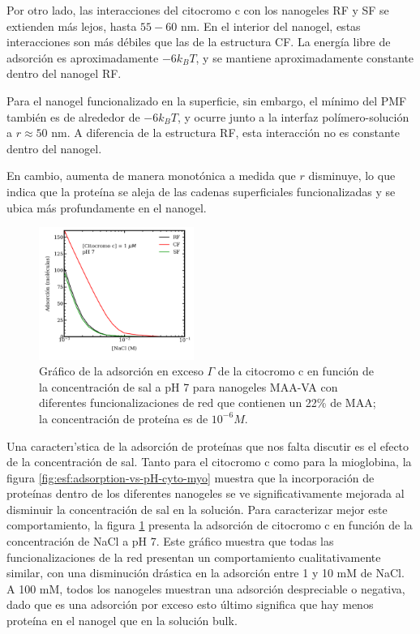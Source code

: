 Por otro lado, las interacciones del citocromo c con los nanogeles RF y SF se extienden m\'as lejos, hasta $55-60$ nm. En el interior del nanogel, estas interacciones son m\'as débiles que las de la estructura CF. La energ\'ia libre de adsorci\'on es aproximadamente $-6 k_BT$, y se mantiene aproximadamente constante dentro del nanogel RF.

Para el nanogel funcionalizado en la superficie, sin embargo, el m\'inimo del PMF tambi\'en es de alrededor de $-6 k_BT$, y ocurre junto a la interfaz pol\'imero-soluci\'on a $r\approx 50$ nm. A diferencia de la estructura RF, esta interacci\'on no es constante dentro del nanogel. 

En cambio, aumenta de manera monot\'onica a medida que $r$ disminuye, lo que indica que la prote\'ina se aleja de las cadenas superficiales funcionalizadas y se ubica m\'as profundamente en el nanogel.




\begin{figure}
     \centering
     \includegraphics[width=0.45\textwidth]{Figures/graphs-gel2/gamma-salts-cito.pdf}
     \caption{Gr\'afico de la adsorci\'on en exceso $\Gamma$ de la citocromo c en funci\'on de la concentraci\'on de sal a pH 7 para nanogeles MAA-VA con diferentes funcionalizaciones de red que contienen un 22\% de MAA; la concentraci\'on de prote\'ina es de $10^{-6}M$.}
     \label{fig:esf:adsorption-vs-salt-cyto}
 \end{figure}
 

Una caracter\i'stica de la adsorci\'on de prote\'inas que nos falta discutir es el efecto de la concentraci\'on de sal.
Tanto para el citocromo c como para la mioglobina, la figura \ref{fig:esf:adsorption-vs-pH-cyto-myo} muestra que la incorporaci\'on de prote\'inas dentro de los diferentes nanogeles se ve significativamente mejorada al disminuir la concentraci\'on de sal en la soluci\'on.
Para caracterizar mejor este comportamiento, la figura \ref{fig:esf:adsorption-vs-salt-cyto} presenta la adsorci\'on de citocromo c en funci\'on de la concentraci\'on de NaCl a pH 7.
Este gr\'afico muestra que todas las funcionalizaciones de la red presentan un comportamiento cualitativamente similar, con una disminuci\'on dr\'astica en la adsorci\'on entre 1 y 10 mM de NaCl.
A 100 mM, todos los nanogeles muestran una adsorci\'on despreciable o negativa, dado que es una adsorci\'on por exceso esto \'ultimo significa que hay menos prote\'ina en el nanogel que en la soluci\'on bulk.

